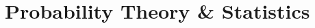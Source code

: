 \documentclass[12pt, a4paper]{report}
\begin{document}
% 
% 
% 
% 
% 
% 
% 
% 
% 
% 
% 
% 
% 
% 
% 
% 

\part{Probability Theory \& Statistics}


% 
% 
% 
% 
% 


% 
% 
% 
% 

% 
% 
% 
% 
% 
% 

% 
% 
% 
% 

% 
% 
% 
% 
% 
% 
% 
% 
\end{document}
